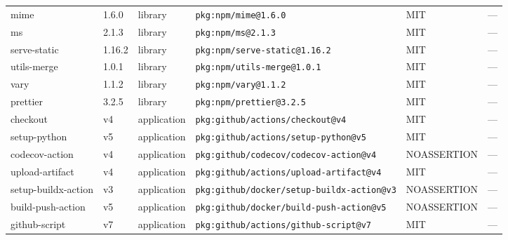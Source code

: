 \documentclass[11pt,a4paper]{article}
\begin{document}
\begin{longtable}{|p{4cm}|p{2cm}|p{1.6cm}|p{5cm}|p{1.5cm}|p{3.5cm}|}
\raggedright mime & 1.6.0 & library & \small\texttt{pkg:npm/mime@1.6.0} & MIT & \small — \\
\raggedright ms & 2.1.3 & library & \small\texttt{pkg:npm/ms@2.1.3} & MIT & \small — \\
\raggedright serve-static & 1.16.2 & library & \small\texttt{pkg:npm/serve-static@1.16.2} & MIT & \small — \\
\raggedright utils-merge & 1.0.1 & library & \small\texttt{pkg:npm/utils-merge@1.0.1} & MIT & \small — \\
\raggedright vary & 1.1.2 & library & \small\texttt{pkg:npm/vary@1.1.2} & MIT & \small — \\
\raggedright prettier & 3.2.5 & library & \small\texttt{pkg:npm/prettier@3.2.5} & MIT & \small — \\
\raggedright checkout & v4 & application & \small\texttt{pkg:github/actions/checkout@v4} & MIT & \small — \\
\raggedright setup-python & v5 & application & \small\texttt{pkg:github/actions/setup-python@v5} & MIT & \small — \\
\raggedright codecov-action & v4 & application & \small\texttt{pkg:github/codecov/codecov-action@v4} & NOASSERTION & \small — \\
\raggedright upload-artifact & v4 & application & \small\texttt{pkg:github/actions/upload-artifact@v4} & MIT & \small — \\
\raggedright setup-buildx-action & v3 & application & \small\texttt{pkg:github/docker/setup-buildx-action@v3} & NOASSERTION & \small — \\
\raggedright build-push-action & v5 & application & \small\texttt{pkg:github/docker/build-push-action@v5} & NOASSERTION & \small — \\
\raggedright github-script & v7 & application & \small\texttt{pkg:github/actions/github-script@v7} & MIT & \small — \\
\end{longtable}
\end{document}
